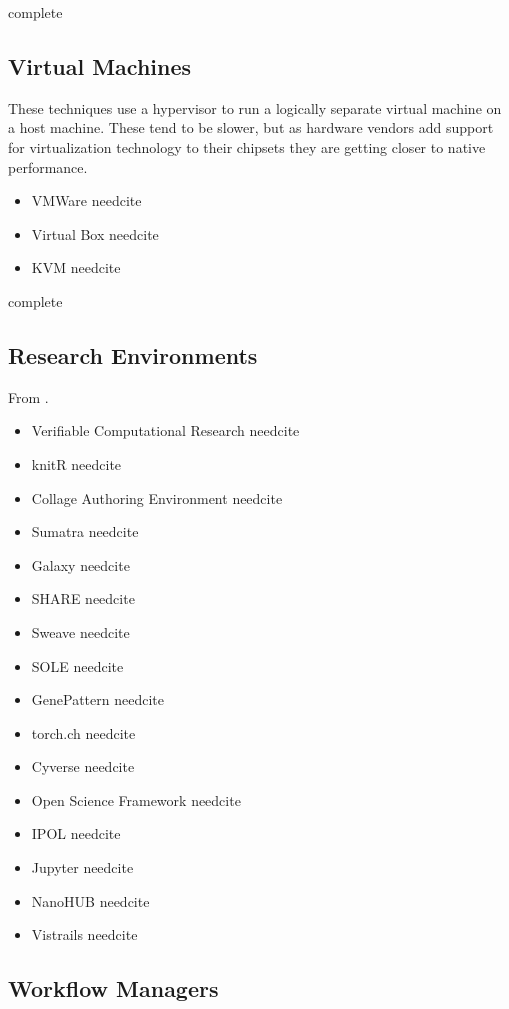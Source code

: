 \documentclass[american]{article}
\newcommand{\complete}{
	\gls{complete}
}
\newcommand{\needcite}{
	\gls{needcite}
}
\begin{document}
\complete

\subsection{Virtual Machines} \label{sec:software-virtual}

These techniques use a hypervisor to run a logically separate virtual machine on a host machine. These tend to be slower, but as hardware vendors add support for virtualization technology to their chipsets they are getting closer to native performance.

\begin{itemize}
\item VMWare \needcite
\item Virtual Box \needcite
\item KVM \needcite
\end{itemize}

\complete

\subsection{Research Environments} \label{sec:software-environments}

From \cite{stodden-sharing-reproducibility-talk-2017}.

\begin{itemize}
\item Verifiable Computational Research \needcite
\item knitR \needcite
\item Collage Authoring Environment \needcite
\item Sumatra \needcite
\item Galaxy \needcite
\item SHARE \needcite
\item Sweave \needcite
\item SOLE \needcite
\item GenePattern \needcite
\item torch.ch \needcite
\item Cyverse \needcite
\item Open Science Framework \needcite
\item IPOL \needcite
\item Jupyter \needcite
\item NanoHUB \needcite
\item Vistrails \needcite
\end{itemize}

\subsection{Workflow Managers} \label{sec:software-managers}
\end{document}

